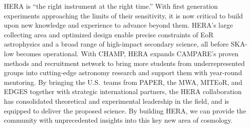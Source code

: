 \documentclass[preprint,11pt]{aastex}
\begin{document}
HERA is ``the right instrument at the right time.'' With first generation experiments approaching the limits of their sensitivity, it is now critical to build upon new knowledge and experience to advance beyond them. HERA's large collecting area and optimized design enable precise constraints of EoR astrophysics and a broad range of high-impact secondary science, all before SKA-low becomes operational.
With CHAMP, HERA expands CAMPARE's proven methods and recruitment network to bring more students from underrepresented groups into cutting-edge astronomy research and support them with year-round mentoring.
By bringing the U.S.\ teams from PAPER, the MWA, MITEoR, and EDGES together with strategic international partners,
the HERA collaboration has consolidated theoretical and experimental leadership in the field, 
and is equipped to deliver the proposed science. By building HERA, we can provide the community with unprecedented insights into this key new area of cosmology.


\clearpage
\setcounter{page}{1}
\thispagestyle{empty}
%
%
\nocite{Beardsley:thesis}
\nocite{kolopanis_et_al2016}

%
{\small }
\end{document}
